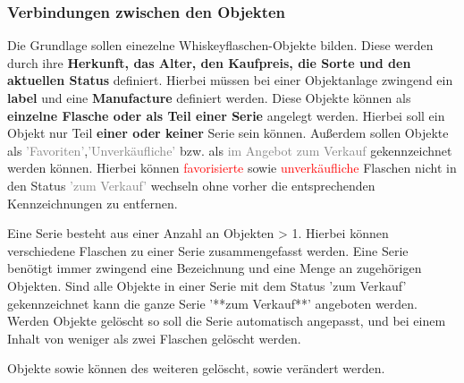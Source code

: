 			\subsubsection{Verbindungen zwischen den Objekten \cite{projektantrag.holzhaeuser}}
			Die Grundlage sollen einezelne Whiskeyflaschen-Objekte bilden. Diese werden durch ihre \textbf{Herkunft, das Alter, den Kaufpreis, die Sorte und den aktuellen Status} definiert. Hierbei müssen bei einer Objektanlage zwingend ein \textbf{label} und eine \textbf{Manufacture} definiert werden. Diese Objekte können als \textbf{einzelne Flasche oder als Teil einer Serie} angelegt werden. Hierbei soll ein Objekt nur Teil \textbf{einer oder keiner} Serie sein können. Außerdem sollen Objekte als \textcolor{gray}{'Favoriten'},\textcolor{gray}{'Unverkäufliche'} bzw. als \textcolor{gray}{im Angebot zum Verkauf} gekennzeichnet werden können. Hierbei können \textcolor{red}{favorisierte} sowie \textcolor{red}{unverkäufliche} Flaschen nicht in den Status \textcolor{gray}{'zum Verkauf'} wechseln ohne vorher die entsprechenden Kennzeichnungen zu entfernen.
			
			Eine Serie besteht aus einer Anzahl an Objekten > 1. Hierbei können verschiedene Flaschen zu einer Serie zusammengefasst werden. Eine Serie benötigt immer zwingend eine Bezeichnung und eine Menge an zugehörigen Objekten. Sind alle Objekte in einer Serie mit dem Status 'zum Verkauf' gekennzeichnet kann die ganze Serie '**zum Verkauf**' angeboten werden. Werden Objekte gelöscht so soll die Serie automatisch angepasst, und bei einem Inhalt von weniger als zwei Flaschen gelöscht werden.
			
			Objekte sowie können des weiteren gelöscht, sowie verändert werden.
	
